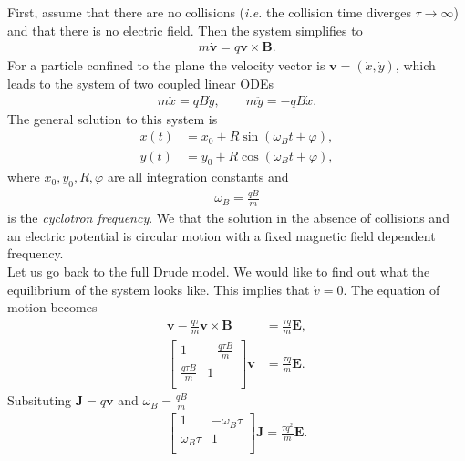         \indent First, assume that there are no collisions (\textit{i.e.} the collision time diverges $\tau \rightarrow\infty$) and that there is no electric field. Then the system simplifies to
        \begin{align}
            m\dot{\bm{v}} =q \bm{v}\times \bm{B}.
        \end{align}
        For a particle confined to the plane the velocity vector is $\bm{v} = (\dot{x}, \dot{y})$, which leads to the system of two coupled linear ODEs
        \begin{align}
            m \ddot{x} = q B \dot{y}, \qquad m \ddot{y}= -q B \dot{x}.
        \end{align}
        The general solution to this system is
        \begin{align}
            x(t) &= x_0 + R \sin\left(\omega_Bt + \varphi \right), \\
            y(t) &= y_0 + R \cos\left(\omega_Bt + \varphi \right),
        \end{align}
        where $x_0, y_0, R, \varphi$ are all integration constants and
        \begin{align}
            \omega_B = \frac{q B}{m}
        \end{align}
        is the \textit{cyclotron frequency}.
        We that the solution in the absence of collisions and an electric potential is circular motion with a fixed magnetic field dependent frequency.\\
        Let us go back to the full Drude model. We would like to find out what the equilibrium of the system looks like. This implies that $\dot{v} =0$. The equation of motion becomes 
        \begin{align}
            \bm{v} - \frac{q \tau}{m}\bm{v}\times\bm{B}  &=\frac{\tau q}{m} \bm{E} ,\\
            \begin{bmatrix}
                1 & -\frac{q \tau B}{m} \\
                \frac{q \tau B}{m} & 1 \\
            \end{bmatrix} \bm{v} &= \frac{\tau q}{m} \bm{E}.
        \end{align}
        Subsituting $\bm{J} = q \bm{v}$ and $\omega_B = \frac{q B}{m}$
        \begin{align}
            \begin{bmatrix}
                1 & -\omega_B \tau \\
                \omega_B \tau & 1 \\
            \end{bmatrix}\bm{J} = \frac{\tau q^2}{m} \bm{E}.
        \end{align}
